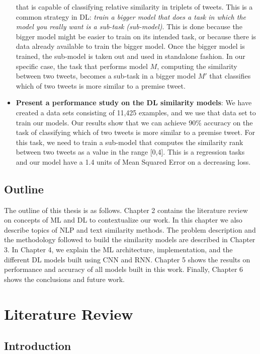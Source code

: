 \documentclass[12pt]{report}
\begin{document}
\begin{itemize}[nolistsep]
that is capable of classifying relative similarity in triplets of tweets. This is a common strategy in \ac{DL}: {\em train a bigger model that does a task in which the model you really want is  
	a sub-task (sub-model)}. This is done because the bigger model might be easier to train on its intended task, or because there is data already available to train the bigger model.  Once the bigger model is trained, the sub-model is taken out and used in standalone fashion. In our specific case, the task that performs model $M$, computing the similarity between two tweets, becomes a sub-task in a bigger
model $M'$ that classifies which of two tweets is more similar to a premise tweet.
		\item \textbf{Present a performance study on the DL similarity models}: We have created a data sets consisting of 11,425 examples, and we use that data set to train our models. Our results show that we can achieve 90\% accuracy on the task of classifying which of two tweets is more similar to a premise tweet.
		For this task, we need to train a sub-model that computes the similarity rank between two tweets as  a value in the range [0,4]. 
		This is a regression tasks and our model have a 1.4 units of Mean Squared Error on a decreasing loss.
	\end{itemize}
	
	\section{Outline}
	The outline of this thesis is as follows. Chapter 2 contains the literature review on concepts of \ac{ML} and \ac{DL} to contextualize our work. In this chapter we also describe topics of \ac{NLP} and text similarity methods. The problem description and the methodology followed to build the similarity models are described in Chapter 3. In Chapter 4, we explain the \ac{ML} architecture, implementation, and  the different \ac{DL} models built using \ac{CNN} and \ac{RNN}. Chapter 5 shows the results on performance and accuracy of all models built in this work. Finally, Chapter 6 shows the conclusions and future work.
	
	\onehalfspacing
	
	\chapter{Literature Review} \label{chapter 2}
	\section{Introduction}
	
\end{document}
